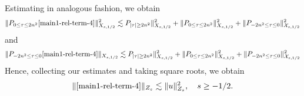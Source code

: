 \documentclass[12pt,reqno]{amsart}
\numberwithin{equation}{section}  %
\renewcommand{\cref}{\Cref}
\begin{document}
Estimating in analogous fashion, we obtain
$$ \| P_{0 \le \tau \le 2n^{2}}\cref{main1-rel-term-4} \|_{X_{s,1/2}}^{2}
\lesssim P_{| \tau | \ge 2n^	2} \|_{X_{s,1/2}}^{2} + \| P_{0 \le  \tau  \le 2n^	2} \|_{X_{s,1/2}}^{2} + \| P_{-2n^{2} \le  \tau \le 0} \|_{\mathcal{X}_{s,1/2}}^{2}
$$
and $$ \| P_{-2n^{2} \le  \tau  \le 0}\cref{main1-rel-term-4} \|_{X_{s,1/2}}
\lesssim P_{| \tau | \ge 2n^	2} \|_{X_{s,1/2}}^{2} + \| P_{0 \le  \tau  \le 2n^	2} \|_{X_{s,1/2}}^{2} + \| P_{-2n^{2} \le  \tau \le 0} \|_{\mathcal{X}_{s,1/2}}^{2}
$$
%
%
Hence, collecting our estimates and taking square roots, we obtain
%
\begin{equation}
  \label{main-int4-est}
	\begin{split}
    \|\cref{main1-rel-term-4}\|_{Z_{s}} \lesssim 
     \|u\|^{2}_{Z_{s}}, \quad   s \ge -1/2.
	\end{split}
\end{equation}

%
%
%
\end{document}
